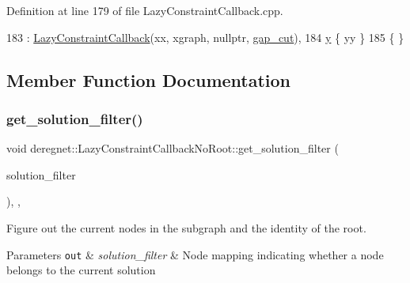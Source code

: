 Definition at line 179 of file Lazy\+Constraint\+Callback.\+cpp.


\begin{DoxyCode}
183  : \hyperlink{classderegnet_1_1LazyConstraintCallback_ad025c982974ffc3e70677948b9668600}{LazyConstraintCallback}(xx, xgraph, \textcolor{keyword}{nullptr}, \hyperlink{classderegnet_1_1LazyConstraintCallback_a6a139307165523fa944e393e01aeec47}{gap\_cut}),
184    \hyperlink{classderegnet_1_1LazyConstraintCallbackNoRoot_aaa32cd3d5b65d1c41174cbc9a120ab64}{y} \{ yy \}
185 \{ \}
\end{DoxyCode}


\subsection{Member Function Documentation}
\mbox{\label{classderegnet_1_1LazyConstraintCallbackNoRoot_a80686ee58b84bb1c73af6f7eddb50db6}} 
\subsubsection{\texorpdfstring{get\+\_\+solution\+\_\+filter()}{get\_solution\_filter()}}
{\footnotesize\ttfamily void deregnet\+::\+Lazy\+Constraint\+Callback\+No\+Root\+::get\+\_\+solution\+\_\+filter (\begin{DoxyParamCaption}\item[{\hyperlink{namespacederegnet_a50db1f8fc7c6a954d825d9e1ed9ad302}{Node\+Filter} \&}]{solution\+\_\+filter }\end{DoxyParamCaption})\hspace{0.3cm}{\ttfamily [override]}, {\ttfamily [private]}, {\ttfamily [virtual]}}



Figure out the current nodes in the subgraph and the identity of the root. 


\begin{DoxyParams}[1]{Parameters}
\mbox{\tt out}  & {\em solution\+\_\+filter} & Node mapping indicating whether a node belongs to the current solution \\
\hline
\end{DoxyParams}


